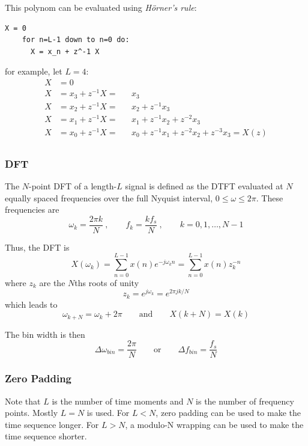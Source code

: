 This polynom can be evaluated using \emph{Hörner's rule}:
\begin{lstlisting}[style=C,frame=none,numbers=none]	
	X = 0
	for n=L-1 down to n=0 do:
	  X = x_n + z^-1 X	
\end{lstlisting}
for example, let $L=4$:
\begin{align*}
	X &= 0 \\
	X &= x_3+z^{-1}X = && x_3 \\
	X &= x_2+z^{-1}X = && x_2+z^{-1}x_3 \\
	X &= x_1+z^{-1}X = && x_1+z^{-1}x_2+z^{-2}x_3 \\
	X &= x_0+z^{-1}X = && x_0+z^{-1}x_1+z^{-2}x_2+z^{-3}x_3 = X(z) \\
\end{align*}

\subsubsection{DFT}
The $N$-point DFT of a length-$L$ signal is defined as the DTFT evaluated
at $N$ equally spaced frequencies over the full Nyquist interval,
$0 \leq \omega \leq 2 \pi$. These frequencies are 
\begin{equation*}
	\omega_k = \frac{2 \pi k}{N}\:, \qquad f_k = \frac{k f_s}{N} \:,\qquad k=0,1,\ldots,N-1
\end{equation*}

Thus, the DFT is
\begin{equation*}
	X(\omega_k) = \sum\limits_{n=0}^{L-1} x(n) e^{-j\omega_kn} = \sum\limits_{n=0}^{L-1} x(n)z_k^{-n}
\end{equation*}
where $z_k$ are the $N$ths roots of unity
\begin{equation*}
	z_k = e^{j\omega_k} = e^{2\pi j k / N}
\end{equation*}
which leads to
\begin{equation*}
	\omega_{k+N} = \omega_k + 2 \pi \qquad \text{and} \qquad X(k+N) = X(k)
\end{equation*}

The bin width is then
\begin{equation*}
	\Delta\omega_{bin}=\frac{2\pi}{N} \qquad \text{or} \qquad \Delta f_{bin}=\frac{f_s}{N}
\end{equation*}


\subsubsection{Zero Padding}
Note that $L$ is the number of time moments and $N$ is the number of
frequency points. Mostly $L=N$ is used. For $L<N$, zero padding can be used
to make the time sequence longer. For $L>N$, a modulo-N wrapping can be
used to make the time sequence shorter. \\


